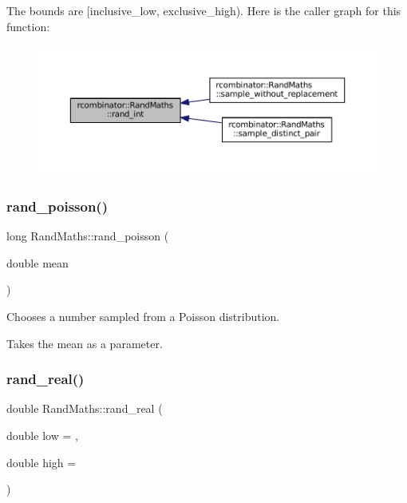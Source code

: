 The bounds are \mbox{[}inclusive\+\_\+low, exclusive\+\_\+high). Here is the caller graph for this function\+:\nopagebreak
\begin{figure}[H]
\begin{center}
\leavevmode
\includegraphics[width=350pt]{classrcombinator_1_1RandMaths_ae417da209eb8a9d1b2217e7a5397926c_icgraph}
\end{center}
\end{figure}
\mbox{\label{classrcombinator_1_1RandMaths_a1fec117f0ebd5a7834fdcf649a23edd7}} 
\subsubsection{\texorpdfstring{rand\+\_\+poisson()}{rand\_poisson()}}
{\footnotesize\ttfamily long Rand\+Maths\+::rand\+\_\+poisson (\begin{DoxyParamCaption}\item[{double}]{mean }\end{DoxyParamCaption})}



Chooses a number sampled from a Poisson distribution. 

Takes the mean as a parameter. \mbox{\label{classrcombinator_1_1RandMaths_aa6441baa59bff50f588c0c54e3c54140}} 
\subsubsection{\texorpdfstring{rand\+\_\+real()}{rand\_real()}}
{\footnotesize\ttfamily double Rand\+Maths\+::rand\+\_\+real (\begin{DoxyParamCaption}\item[{double}]{low = {},  }\item[{double}]{high = {} }\end{DoxyParamCaption})}



